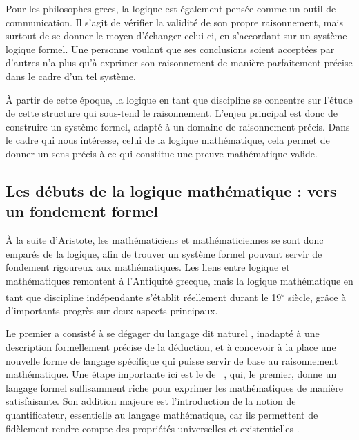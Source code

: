 Pour les philosophes grecs,
la logique est également pensée comme un outil de communication.
Il s’agit de vérifier la validité de son propre raisonnement,
mais surtout de se donner le moyen d’échanger celui-ci,
en s’accordant sur un système logique formel.%
Une personne voulant que ses conclusions soient acceptées par d’autres n’a plus qu’à
exprimer son raisonnement de manière parfaitement précise dans le cadre d’un tel système.

À partir de cette époque, la logique en tant que discipline se concentre sur l’étude
de cette structure qui sous-tend le raisonnement.
L’enjeu principal est donc de construire un système formel,
adapté à un domaine de raisonnement précis. Dans le cadre qui nous intéresse,
celui de la logique mathématique, cela permet de donner un sens précis à
ce qui constitue une preuve mathématique valide.

\subsection{Les débuts de la logique mathématique : vers un fondement formel}

À la suite d’Aristote, les mathématiciens et mathématiciennes se sont donc emparés
de la logique, afin de trouver un système formel
pouvant servir de fondement rigoureux aux mathématiques.
Les liens entre logique et mathématiques remontent à l’Antiquité grecque,
mais la logique mathématique en tant que discipline indépendante s’établit réellement
durant le 19\textsuperscript{e} siècle, grâce à d’importants progrès
sur deux aspects principaux.

Le premier a consisté à se dégager du langage dit
naturel%
, inadapté à une description formellement précise de la déduction, et à
concevoir à la place une nouvelle forme de langage spécifique qui puisse servir de
base au raisonnement mathématique.
Une étape importante ici est le  de
\citeauthor{Begriffsschrift}~,
qui, le premier, donne un langage formel suffisamment riche pour exprimer les mathématiques
de manière satisfaisante. Son addition majeure est l’introduction
de la notion de quantificateur, essentielle au langage mathématique,
car ils permettent de fidèlement rendre compte des propriétés universelles%
et existentielles%
.

